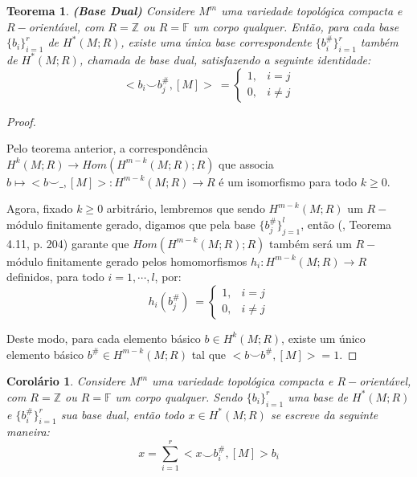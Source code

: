 \documentclass[12pt,oneside]{book} %
\newtheorem{teo}    {\hspace{0.5cm}Teorema}[chapter]
\newtheorem{cor}    {\hspace{0.5cm}Corol\'ario}[chapter]
\newcommand{\ds}{\displaystyle}
\newcommand{\Z}{\mathbb{Z}}
\newcommand{\F}{\mathbb{F}}
\newcommand{\ccup}{\smile}
\begin{document}
\begin{teo}\label{base_dual_2}{\bf (Base Dual)}
	Considere $M^{m}$ uma variedade topológica compacta e $R-$orientável, com $R=\Z$ ou $R=\F$ um corpo qualquer. Então, para cada base $\{b_{i}\}_{i=1}^{r}$ de $H^{*}(M;R)$, existe uma única base correspondente $\{b^{\#}_{i}\}_{i=1}^{r}$ também de $H^{*}(M;R)$, chamada de base dual, satisfazendo a seguinte identidade:
	$$ <b_{i}\ccup b_{j}^{\#},[M]> \ =\left\{ \begin{array}{rl}
		1, & i=j \\
		0, & i\neq j
	\end{array}\right. $$
\end{teo}

\begin{proof}
	
	\
	
	\par Pelo teorema anterior, a correspondência $H^{k}(M;R)\to Hom(H^{m-k}(M;R);R)$ que associa $b\mapsto <b\ccup \_,[M]>:H^{m-k}(M;R)\to R$ é um isomorfismo para todo $k\geq 0$.
	
	\par Agora, fixado $k\geq 0$ arbitrário, lembremos que sendo $H^{m-k}(M;R)$ um $R-$módulo finitamente gerado, digamos que pela base $\{b^{\#}_{j}\}_{j=1}^{l}$, então (\cite{hungerford}, Teorema 4.11, p. 204) garante que $Hom(H^{m-k}(M;R);R)$ também será um $R-$módulo finitamente gerado pelos homomorfismos $h_{i}:H^{m-k}(M;R)\to R$ definidos, para todo $i=1,\cdots,l$, por:
	$$ h_{i}(b^{\#}_{j}) \ =\left\{ \begin{array}{rl}
		1, & i=j \\
		0, & i\neq j
	\end{array}\right. $$
	
	\par Deste modo, para cada elemento básico $b\in H^{k}(M;R)$, existe um único elemento básico $b^{\#}\in H^{m-k}(M;R)$ tal que $<b\ccup b^{\#},[M]>=1$.
	
\end{proof}

\begin{cor}\label{base_dual_3}
	Considere $M^{m}$ uma variedade topológica compacta e $R-$orientável, com $R=\Z$ ou $R=\F$ um corpo qualquer. Sendo $\{b_{i}\}_{i=1}^{r}$ uma base de $H^{*}(M;R)$ e $\{b^{\#}_{i}\}_{i=1}^{r}$ sua base dual, então todo $x\in H^{*}(M;R)$ se escreve da seguinte maneira:
	$$ x=\ds\sum_{i=1}^{r}<x\ccup b^{\#}_{i},[M]>b_{i} $$
\end{cor}
\end{document}
